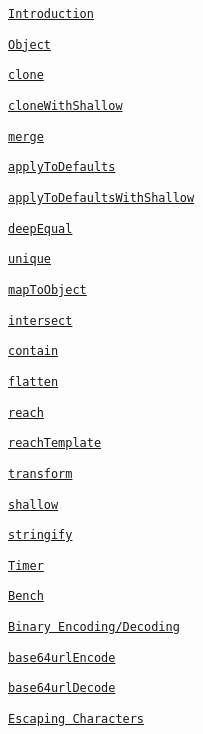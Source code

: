 \begin{DoxyItemize}
\item \href{#introduction}{\tt Introduction}
\item \href{#object}{\tt Object}
\begin{DoxyItemize}
\item \href{#cloneobj}{\tt clone}
\item \href{#clonewithshallowobj-keys}{\tt clone\+With\+Shallow}
\item \href{#mergetarget-source-isnulloverride-ismergearrays}{\tt merge}
\item \href{#applytodefaultsdefaults-options-isnulloverride}{\tt apply\+To\+Defaults}
\item \href{#applytodefaultswithshallowdefaults-options-keys}{\tt apply\+To\+Defaults\+With\+Shallow}
\item \href{#deepequala-b}{\tt deep\+Equal}
\item \href{#uniquearray-key}{\tt unique}
\item \href{#maptoobjectarray-key}{\tt map\+To\+Object}
\item \href{#intersectarray1-array2}{\tt intersect}
\item \href{#containref-values-options}{\tt contain}
\item \href{#flattenarray-target}{\tt flatten}
\item \href{#reachobj-chain-options}{\tt reach}
\item \href{#reachtemplateobj-template-options}{\tt reach\+Template}
\item \href{#transformobj-transform-options}{\tt transform}
\item \href{#shallowobj}{\tt shallow}
\item \href{#stringifyobj}{\tt stringify}
\end{DoxyItemize}
\item \href{#timer}{\tt Timer}
\item \href{#bench}{\tt Bench}
\item \href{#binary-encodingdecoding}{\tt Binary Encoding/\+Decoding}
\begin{DoxyItemize}
\item \href{#base64urlencodevalue}{\tt base64url\+Encode}
\item \href{#base64urldecodevalue}{\tt base64url\+Decode}
\end{DoxyItemize}
\item \href{#escaping-characters}{\tt Escaping Characters}
\begin{DoxyItemize}

\end{DoxyItemize}
\end{DoxyItemize}
